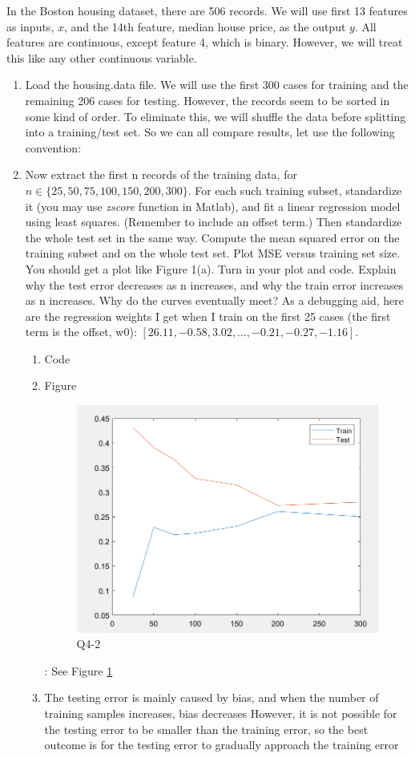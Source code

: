 \documentclass[11pt]{article}
\newcommand{\mfile}[1]  {{\small }} %
\begin{document}
In the Boston housing dataset, there are 506 records. We will
use first 13 features as inputs, $x$, and the 14th feature, median house price, as the output $y$. All features are continuous,
except feature 4, which is binary. However, we will treat this like any other continuous variable.
\begin{enumerate}
	\item Load the housing.data file. We will use the first 300 cases for training and the remaining 206 cases for
	testing. However, the records seem to be sorted in some kind of order. To eliminate this, we will shuffle the data
	before splitting into a training/test set. So we can all compare results, let use the following convention:
	\mfile{sample.m}
	\item Now extract the first n records of the training data, for $n \in \{25, 50, 75, 100, 150, 200, 300\}$. For each such
	training subset, standardize it (you may use \textit{zscore} function in Matlab), and fit a linear regression model using least squares. (Remember to include
	an offset term.) Then standardize the whole test set in the same way. Compute the mean squared error on
	the training subset and on the whole test set. Plot MSE versus training set size. You should get a plot like
	Figure 1(a). Turn in your plot and code. Explain why the test error decreases as n increases, and why the train
	error increases as n increases. Why do the curves eventually meet?
	As a debugging aid, here are the regression weights I get when I train on the first 25 cases (the first term is the
	offset, w0): $[26.11, -0.58, 3.02,\dots,-0.21, -0.27, -1.16]$.
	\begin{enumerate}
		\item Code
		\mfile{q4_2.m}
		\item Figure
		\begin{figure}[h!]
			\centering
			\includegraphics[width=0.5\linewidth]{q42.png}
			\caption{Q4-2}
			\label{fig:Q4_2}
		\end{figure}:
		See Figure \ref{fig:Q4_2}
		\item The testing error is mainly caused by bias, and when the number of training samples increases, bias decreases
		However, it is not possible for the testing error to be smaller than the training error, so the best outcome is for the testing error to gradually approach the training error
	\end{enumerate}
	

\end{enumerate}
\end{document}
